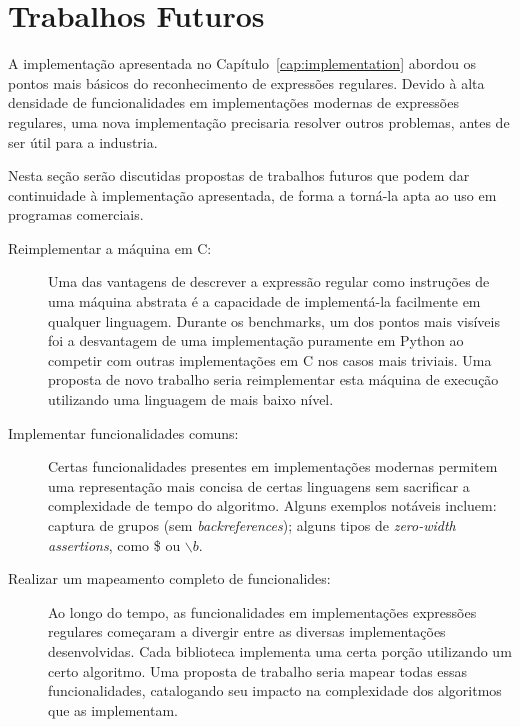\documentclass[a4paper,12pt,oneside,onecolumn]{uerj}
\begin{document}
\section{Trabalhos Futuros}

A implementação apresentada no Capítulo~\ref{cap:implementation} abordou os pontos mais básicos do reconhecimento de expressões regulares. Devido à alta densidade de funcionalidades em implementações modernas de expressões regulares, uma nova implementação precisaria resolver outros problemas, antes de ser útil para a industria.

Nesta seção serão discutidas propostas de trabalhos futuros que podem dar continuidade à implementação apresentada, de forma a torná-la apta ao uso em programas comerciais.

\begin{description}
	\item[Reimplementar a máquina em C:] Uma das vantagens de descrever a expressão regular como instruções de uma máquina abstrata é a capacidade de implementá-la facilmente em qualquer linguagem. Durante os benchmarks, um dos pontos mais visíveis foi a desvantagem de uma implementação puramente em Python ao competir com outras implementações em C nos casos mais triviais. Uma proposta de novo trabalho seria reimplementar esta máquina de execução utilizando uma linguagem de mais baixo nível.
	
	\item[Implementar funcionalidades comuns:] Certas funcionalidades presentes em implementações modernas permitem uma representação mais concisa de certas linguagens sem sacrificar a complexidade de tempo do algoritmo. Alguns exemplos notáveis incluem: captura de grupos (sem \emph{backreferences}); alguns tipos de \emph{zero-width assertions}, como \$ ou $\backslash b$.
	
	\item[Realizar um mapeamento completo de funcionalides:] Ao longo do tempo, as funcionalidades em implementações expressões regulares começaram a divergir entre as diversas implementações desenvolvidas. Cada biblioteca implementa uma certa porção utilizando um certo algoritmo. Uma proposta de trabalho seria mapear todas essas funcionalidades, catalogando seu impacto na complexidade dos algoritmos que as implementam.
	
	
\end{description}

\backmatter


\appendix
\end{document}
